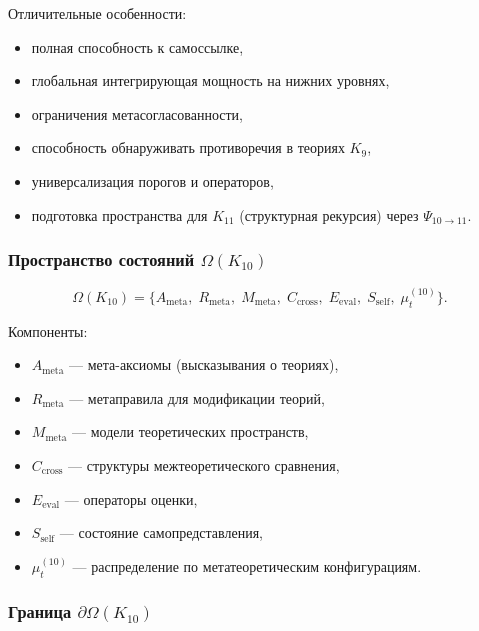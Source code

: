 Отличительные особенности:
\begin{itemize}
    \item полная способность к самоссылке,
    \item глобальная интегрирующая мощность на нижних уровнях,
    \item ограничения метасогласованности,
    \item способность обнаруживать противоречия в теориях $K_9$,
    \item универсализация порогов и операторов,
    \item подготовка пространства для $K_{11}$ (структурная рекурсия) через $\Psi_{10\to11}$.
\end{itemize}

\subsubsection{Пространство состояний $\Omega(K_{10})$}

\[
\Omega(K_{10})=
\{
A_{\mathrm{meta}},\;
R_{\mathrm{meta}},\;
M_{\mathrm{meta}},\;
C_{\mathrm{cross}},\;
E_{\mathrm{eval}},\;
S_{\mathrm{self}},\;
\mu^{(10)}_t
\}.
\]

Компоненты:
\begin{itemize}
    \item $A_{\mathrm{meta}}$ — мета-аксиомы (высказывания о теориях),
    \item $R_{\mathrm{meta}}$ — метаправила для модификации теорий,
    \item $M_{\mathrm{meta}}$ — модели теоретических пространств,
    \item $C_{\mathrm{cross}}$ — структуры межтеоретического сравнения,
    \item $E_{\mathrm{eval}}$ — операторы оценки,
    \item $S_{\mathrm{self}}$ — состояние самопредставления,
    \item $\mu^{(10)}_t$ — распределение по метатеоретическим конфигурациям.
\end{itemize}

\subsubsection{Граница $\partial\Omega(K_{10})$}

